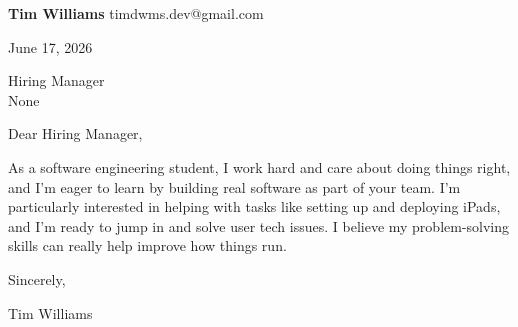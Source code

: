 \documentclass[12pt]{article}
\begin{document}
\textbf{Tim Williams} \hfill timdwms.dev@gmail.com

\vspace{1em}

June 17, 2026

\vspace{1em}

Hiring Manager \\
None

\vspace{1em}

Dear Hiring Manager,

As a software engineering student, I work hard and care about doing things right, and I'm eager to learn by building real software as part of your team. I'm particularly interested in helping with tasks like setting up and deploying iPads, and I’m ready to jump in and solve user tech issues. I believe my problem-solving skills can really help improve how things run.

\vspace{1em}

Sincerely,

\vspace{2em}

Tim Williams
\end{document}
